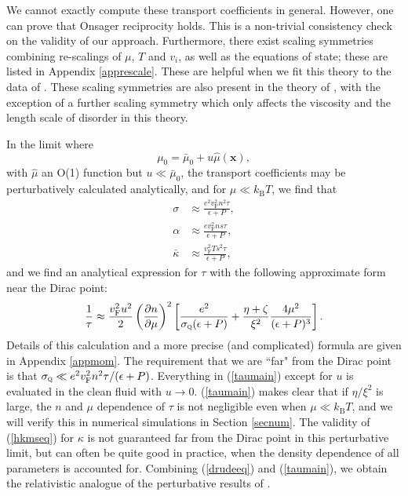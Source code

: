 \documentclass[10pt, oneside]{book}
\begin{document}
\begin{doublespace}
We cannot exactly compute these transport coefficients in general.   However, one can prove \cite{Lucas:2015lna} that Onsager reciprocity holds.  This is a non-trivial consistency check on the validity of our approach.   Furthermore, there exist scaling symmetries combining re-scalings of $\mu$, $T$ and $v_i$, as well as the equations of state;  these are listed in Appendix \ref{apprescale}.   These are helpful when we fit this theory to the data of \cite{Crossno1058}.   These scaling symmetries are also present in the theory of \cite{hkms}, with the exception of a further scaling symmetry which only affects the viscosity and the length scale of disorder in this theory.

In the limit where \begin{equation}
\mu_0 = \bar\mu_0 +  u \hat\mu(\mathbf{x}),  \label{pertlimit}
\end{equation} 
with $\hat\mu$ an O(1) function but $u \ll \bar\mu_0$, the transport coefficients may be perturbatively calculated analytically, and for $\mu \ll k_{\mathrm{B}}T$,  we find that \begin{subequations}\label{drudeeq}\begin{align}
\sigma &\approx \frac{e^2v_{\mathrm{F}}^2n^2\tau}{\epsilon+P}, \\
\alpha &\approx \frac{ev_{\mathrm{F}}^2ns\tau}{\epsilon+P}, \\
\bar\kappa &\approx \frac{v_{\mathrm{F}}^2Ts^2\tau}{\epsilon+P},
\end{align}\end{subequations} 
and we find an analytical expression for $\tau$ with the following approximate form near the Dirac point: \begin{equation}
\frac{1}{\tau} \approx \frac{v_{\mathrm{F}}^2 u^2}{2} \left(\frac{\partial n}{\partial \mu}\right)^2 \left[\frac{e^2 }{\sigma_{\textsc{q}}(\epsilon+P)} + \frac{\eta+\zeta}{\xi^2} \frac{4\mu^2}{(\epsilon+P)^3} \right].  \label{taumain}
\end{equation}  Details of this calculation and a more precise (and complicated) formula are given in Appendix \ref{appmom}.    The requirement that we are ``far" from the Dirac point is that $\sigma_{\textsc{q}} \ll e^2 v_{\mathrm{F}}^2n^2\tau/(\epsilon+P)$.   Everything in (\ref{taumain}) except for $u$ is evaluated in the clean fluid with $u\rightarrow 0$.    (\ref{taumain}) makes clear that if $\eta/\xi^2$ is large, the $n$ and $\mu$ dependence of $\tau$ is not negligible even when $\mu \ll  k_{\mathrm{B}}T$, and we will verify this in numerical simulations in Section \ref{secnum}.    The validity of (\ref{hkmseq}) for $\kappa$ is not guaranteed far from the Dirac point in this perturbative limit, but can often be quite good in practice, when the density dependence of all parameters is accounted for.     Combining (\ref{drudeeq}) and (\ref{taumain}), we obtain the relativistic analogue of the perturbative results of \cite{andreev2011}. 


\end{doublespace}
\end{document}
